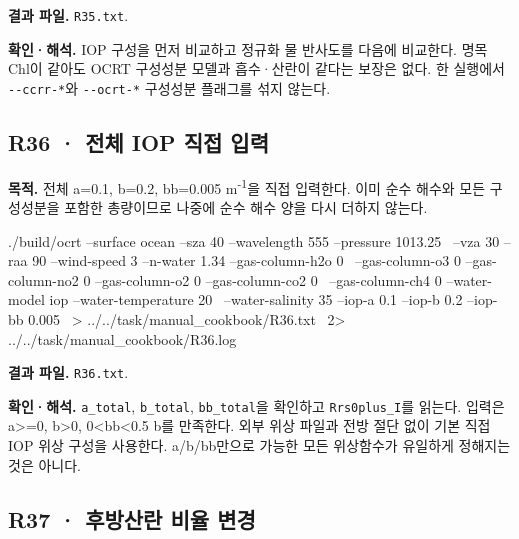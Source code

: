 \textbf{결과 파일. }\texttt{R35.txt}.

\textbf{확인·해석. }IOP 구성을 먼저 비교하고 정규화 물 반사도를 다음에 비교한다. 명목 Chl이 같아도 OCRT 구성성분 모델과 흡수·산란이 같다는 보장은 없다. 한 실행에서 \texttt{-\allowbreak{}-\allowbreak{}ccrr-\allowbreak{}*}와 \texttt{-\allowbreak{}-\allowbreak{}ocrt-\allowbreak{}*} 구성성분 플래그를 섞지 않는다.


\subsection{R36 · 전체 IOP 직접 입력}
\label{sec:auto:09_cookbook:6.11}

\label{recipe:R36}

\textbf{목적. }전체 a=0.1, b=0.2, bb=0.005 m\textsuperscript{-1}을 직접 입력한다. 이미 순수 해수와 모든 구성성분을 포함한 총량이므로 나중에 순수 해수 양을 다시 더하지 않는다.

\noindent\begin{minipage}{\linewidth}
\begin{ManualCode}

./build/ocrt --surface ocean --sza 40 --wavelength 555 --pressure 1013.25 \
  --vza 30 --raa 90 --wind-speed 3 --n-water 1.34 --gas-column-h2o 0 \
  --gas-column-o3 0 --gas-column-no2 0 --gas-column-o2 0 --gas-column-co2 0 \
  --gas-column-ch4 0 --water-model iop --water-temperature 20 \
  --water-salinity 35 --iop-a 0.1 --iop-b 0.2 --iop-bb 0.005 \
  > ../../task/manual_cookbook/R36.txt \
  2> ../../task/manual_cookbook/R36.log

\end{ManualCode}
\end{minipage}\par

\textbf{결과 파일. }\texttt{R36.txt}.

\textbf{확인·해석. }\texttt{a\_\allowbreak{}total}, \texttt{b\_\allowbreak{}total}, \texttt{bb\_\allowbreak{}total}을 확인하고 \texttt{Rrs0plus\_\allowbreak{}I}를 읽는다. 입력은 a>=0, b>0, 0<bb<0.5 b를 만족한다. 외부 위상 파일과 전방 절단 없이 기본 직접 IOP 위상 구성을 사용한다. a/b/bb만으로 가능한 모든 위상함수가 유일하게 정해지는 것은 아니다.


\subsection{R37 · 후방산란 비율 변경}
\label{sec:auto:09_cookbook:6.12}

